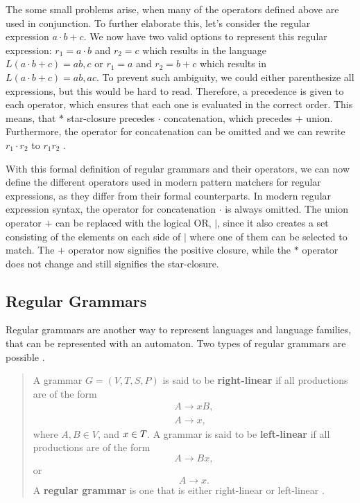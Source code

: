 \documentclass[runningheads]{llncs}
\begin{document}
The some small problems arise, when many of the operators defined above are used in conjunction. To further elaborate this, let's consider the regular expression $a \cdot b + c$. We now have two valid options to represent this regular expression: $r_1 = a \cdot b$ and $r_2 = c$ which results in the language $L(a \cdot b + c)= {ab,c}$ or $r_1=a$ and $r_2=b+c$ which results in $L(a \cdot b + c)={ab,ac}$. To prevent such ambiguity, we could either parenthesize all expressions, but this would be hard to read. Therefore, a precedence is given to each operator, which ensures that each one is evaluated in the correct order. This means, that $*$ star-closure precedes $\cdot$ concatenation, which precedes $+$ union. Furthermore, the operator for concatenation can be omitted and we can rewrite $r_1 \cdot r_2$ to $r_1 r_2$ \cite[76]{fla-2017}.

With this formal definition of regular grammars and their operators, we can now define the different operators used in modern pattern matchers for regular expressions, as they differ from their formal counterparts. In modern regular expression syntax, the operator for concatenation $\cdot$ is always omitted. The union operator $+$ can be replaced with the logical OR, $|$, since it also creates a set consisting of the elements on each side of $|$ where one of them can be selected to match. The $+$ operator now signifies the positive closure, while the $*$ operator does not change and still signifies the star-closure.


\subsection{Regular Grammars}
Regular grammars are another way to represent languages and language families, that can be represented with an automaton. Two types of regular grammars are possible \cite[92]{fla-2017}.
\begin{quote}
A grammar $G=(V,T,S,P)$ is said to be \textbf{right-linear} if all productions are of the form
\begin{align}
A \rightarrow xB,\\
A \rightarrow x,
\end{align}
where $A,B \in V$, and $x \in T_{\*}$. A grammar is said to be \textbf{left-linear} if all productions are of the form
\begin{equation}
A \rightarrow Bx,
\end{equation}
or
\begin{equation}
A \rightarrow x.
\end{equation}
A \textbf{regular grammar} is one that is either right-linear or left-linear \cite[92]{fla-2017}.
\end{quote}
\end{document}
